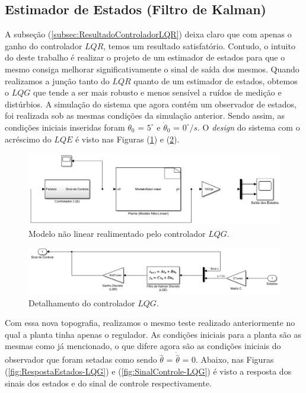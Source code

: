 \subsection{Estimador de Estados (Filtro de Kalman)}

A subseção (\ref{subsec:ResultadoControladorLQR}) deixa claro que com apenas o ganho do controlador $LQR$, temos um resultado satisfatório. Contudo, o intuito do deste trabalho é realizar o projeto de um estimador de estados para que o mesmo consiga melhorar significativamente o sinal de saída dos mesmos. Quando realizamos a junção tanto do $LQR$ quanto de um estimador de estados, obtemos o $LQG$ que tende a ser mais robusto e menos sensível a ruídos de medição e distúrbios. A simulação do sistema que agora contém um observador de estados, foi realizada sob as mesmas condições da simulação anterior. Sendo assim, as condições iniciais inseridas foram $\theta_0$ = $5^\circ$ e $\dot{\theta}_0$ = $0^\circ/s$. O \textit{design} do sistema com o acréscimo do $LQE$ é visto nas Figuras (\ref{fig:Implementacao-LQG}) e (\ref{fig:Topografia-controladorLQG}).
\begin{figure}[H]
    \centering
    \includegraphics[scale=0.6]{ProjControladores/lqg_control.png}
    \caption{Modelo não linear realimentado pelo controlador $LQG$.}
    \label{fig:Implementacao-LQG}
\end{figure}{}
\begin{figure}[H]
    \centering
    \includegraphics[scale=0.5]{ProjControladores/topografia_lqg.png}
    \caption{Detalhamento do controlador $LQG$.}
    \label{fig:Topografia-controladorLQG}
\end{figure}{}

Com essa nova topografia, realizamos o mesmo teste realizado anteriormente no qual a planta tinha apenas o regulador. As condições iniciais para a planta são as mesmas como já mencionado, o que difere agora são as condições iniciais do observador que foram setadas como sendo $\hat{\theta}$ = $\dot{\hat{\theta}}$ = $0$. Abaixo, nas Figuras (\ref{fig:RespostaEstados-LQG}) e (\ref{fig:SinalControle-LQG}) é visto a resposta dos sinais dos estados e do sinal de controle respectivamente.

